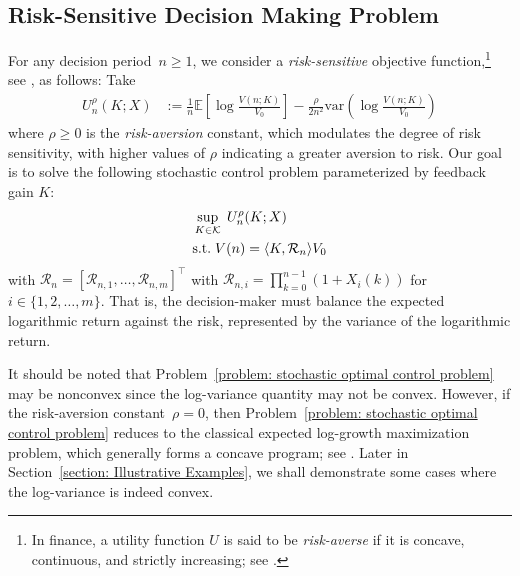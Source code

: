  


\subsection{Risk-Sensitive Decision Making Problem}
For any decision period~$n \geq 1$, we consider a  \textit{risk-sensitive} objective function,\footnote{In finance, a utility function $U$ is said to be \textit{risk-averse} if it is concave, continuous, and strictly increasing; see \cite{luenberger2013investment}. } see \cite{luenberger1993preference}, as follows:
Take
\begin{align} \label{eq: risk-sensitive objective}
	{U_n^\rho}(K; X) 
	&:= \frac{1}{n} \mathbb{E}\left[ \log \frac{V(n; K)}{V_0} \right] - \frac{\rho}{2n^2}\text{var}\left( \log \frac{V(n; K)}{V_0} \right)
\end{align}
where $\rho \geq 0$ is the \textit{risk-aversion} constant, which modulates the degree of risk sensitivity, with higher values of $\rho$ indicating a greater aversion to risk.
Our goal is to solve the following stochastic control problem parameterized by feedback gain $K$:
\begin{align} \label{problem: stochastic optimal control problem}
    \begin{aligned}
        &\sup_{K \in \mathcal{K}}\; U_n^\rho (K; X)\\
        &{\rm s.t. } \; V(n) = \langle K, \mathcal{R}_n \rangle V_0 
    \end{aligned}
\end{align}
with $\mathcal{R}_n = [\mathcal{R}_{n,1}, \dots, \mathcal{R}_{n,m}]^\top$ with $ \mathcal{R}_{n,i} = \prod_{k=0}^{n - 1} ( 1 + X_i(k) ) $ for $i \in \{1, 2, \dots, m \}$.
That is, the decision-maker must balance the expected logarithmic return against the risk, represented by the variance of the logarithmic return.

\begin{remark}\rm
    It should be noted that Problem~\eqref{problem: stochastic optimal control problem} may be nonconvex since the log-variance quantity may not be convex. However, if the risk-aversion constant~$\rho =0$, then Problem~\eqref{problem: stochastic optimal control problem} reduces to the classical expected log-growth maximization problem, which generally forms a concave program; see \cite{maclean2011kelly,hsieh2023asymptotic}. Later in Section~\ref{section: Illustrative Examples}, we shall demonstrate some cases where the log-variance is indeed convex.
\end{remark}


